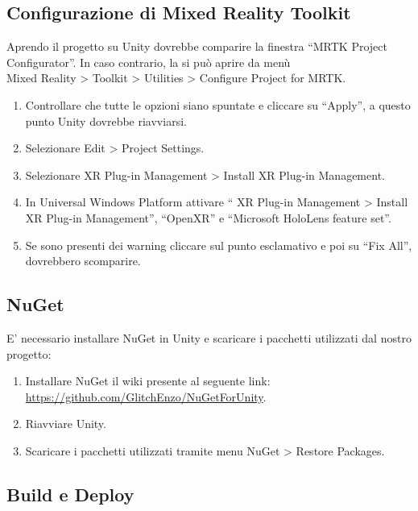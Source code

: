 \subsection{Configurazione di Mixed Reality Toolkit}
Aprendo il progetto su Unity dovrebbe comparire la finestra “MRTK Project Configurator”. In caso contrario, la si può aprire da menù \\ 
Mixed Reality > Toolkit > Utilities > Configure Project for MRTK.
\begin{enumerate}
    \item Controllare che tutte le opzioni siano spuntate e cliccare su “Apply”, a questo punto Unity dovrebbe riavviarsi.
    \item Selezionare Edit > Project Settings.
    \item Selezionare XR Plug-in Management > Install XR Plug-in Management.
    \item In Universal Windows Platform attivare “ XR Plug-in Management > Install XR Plug-in Management”, “OpenXR” e “Microsoft HoloLens feature set”.
    \item Se sono presenti dei warning cliccare sul punto esclamativo e poi su “Fix All”, dovrebbero scomparire.
\end{enumerate}

\subsection{NuGet}
E' necessario installare NuGet in Unity e scaricare i pacchetti utilizzati dal nostro progetto:

\begin{enumerate}
    \item Installare NuGet il wiki presente al seguente link: \url{https://github.com/GlitchEnzo/NuGetForUnity}.
    \item Riavviare Unity.
    \item Scaricare i pacchetti utilizzati tramite menu NuGet > Restore Packages.
\end{enumerate}

\subsection{Build e Deploy}

